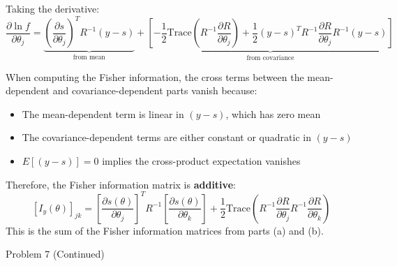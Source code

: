 \documentclass[12pt,a4paper,onecolumn]{exam}
\newcommand{\questionheader}[1]{%
  \begin{tcolorbox}[
    enhanced,
    colback=black,
    coltext=white,
    boxrule=0pt,
    fontupper=\Large\bfseries,
    arc=4mm
  ]
  #1
  \end{tcolorbox}%
}
\begin{document}
\begin{solution}
Taking the derivative:
\[
\frac{\partial \ln f}{\partial \theta_j} = \underbrace{\left(\frac{\partial s}{\partial \theta_j}\right)^T R^{-1}(y-s)}_{\text{from mean}} + \underbrace{\left[-\frac{1}{2}\text{Trace}\left(R^{-1}\frac{\partial R}{\partial \theta_j}\right) + \frac{1}{2}(y-s)^T R^{-1}\frac{\partial R}{\partial \theta_j}R^{-1}(y-s)\right]}_{\text{from covariance}}
\]

When computing the Fisher information, the cross terms between the mean-dependent and covariance-dependent parts vanish because:
\begin{itemize}
    \item The mean-dependent term is linear in $(y-s)$, which has zero mean
    \item The covariance-dependent terms are either constant or quadratic in $(y-s)$
    \item $E[(y-s)] = 0$ implies the cross-product expectation vanishes
\end{itemize}

Therefore, the Fisher information matrix is \textbf{additive}:
\[
\boxed{[I_y(\theta)]_{jk} = \left[\frac{\partial s(\theta)}{\partial \theta_j}\right]^T R^{-1} \left[\frac{\partial s(\theta)}{\partial \theta_k}\right] + \frac{1}{2}\text{Trace}\left(R^{-1}\frac{\partial R}{\partial \theta_j}R^{-1}\frac{\partial R}{\partial \theta_k}\right)}
\]
This is the sum of the Fisher information matrices from parts (a) and (b).
\end{solution}

\questionheader{Problem 7 (Continued)}
\end{document}
